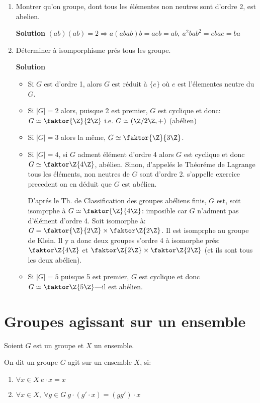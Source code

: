 \begin{examplebox}
	\begin{enumerate}
		\item Montrer qu'on groupe, dont tous les élémentes non neutres sont d'ordre 2, est abelien.
		
		\textbf{Solution} $(ab)(ab)=2 \Rightarrow a(abab)b=aeb=ab,\ a^2bab^2=ebae=ba$
		\item Déterminer à isomporphisme prés tous les groupe.
		
		\textbf{Solution} 
		\begin{itemize}
			\item Si $G$ est d'ordre 1, alors $G$ est réduit à $\{e\}$ où $e$ est l'élementes neutre du $G$.
			\item Si $|G|=2$ alors, puisque 2 est premier, $G$ est cyclique et donc: $G\simeq \faktor{\Z}{2\Z}$ i.e. $G\simeq (\Z/2\Z, +)$ (abélien)
			\item Si $|G|=3$ alors la même, $G\simeq \faktor{\Z}{3\Z}$.
			\item Si $|G|=4$, si $G$ adment élément d'ordre 4 alors $G$ est cyclique et donc $G\simeq \faktor\Z{4\Z}$, abélien. Sinon, d'appelés le Théoréme de Lagrange tous les éléments, non neutres de $G$ sont d'ordre 2. s'appelle exercice precedent on en déduit que $G$ est abélien.
			
			D'aprés le Th. de Classification des groupes abéliens finis, $G$ est, soit isomprphe à $G\simeq \faktor{\Z}{4\Z}$: imposible car $G$ n'adment pas d'élément d'ordre 4. Soit isomorphe à: $G=\faktor{\Z}{2\Z}\times \faktor\Z{2\Z}$. Il est isomprphe au groupe de Klein. Il y a donc deux groupes s'ordre 4 à isomorphe prés: $\faktor\Z{4\Z}$ et $\faktor\Z{2\Z}\times\faktor\Z{2\Z}$ (et ils sont tous les deux abélien).
			\item Si $|G|=5$ puisque 5 est premier, $G$ est cyclique et donc $G \simeq \faktor\Z{5\Z}$---il est abélien.
		\end{itemize}
	\end{enumerate}
\end{examplebox}

\section{Groupes agissant sur un ensemble} %

Soient $G$ est un groupe et $X$ un ensemble.
\begin{definition}
	On dit un groupe $G$ agit sur un ensemble $X$, si:
	\begin{enumerate}
		\item $\forall x\in X\ e\cdot x= x$
		\item $\forall x\in X,\ \forall g\in G\ g\cdot(g'\cdot x)=(gg')\cdot x$
	\end{enumerate}
\end{definition}

